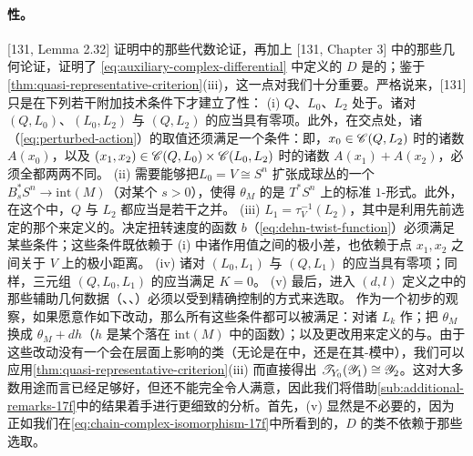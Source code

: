\paragraph{\trAcyclic{}性。}\label{sub:acyclicity}
[131, Lemma 2.32] 证明中的那些代数论证，再加上 [131, Chapter 3] 中的那些几何论证，证明了 \eqref{eq:auxiliary-complex-differential} 中定义的\trComplex{} $D$ 是\trAcyclic{}的；鉴于\cref{thm:quasi-representative-criterion}(iii)，这一点对我们十分重要。严格说来，[131] 只是在下列若干附加技术条件下才建立了\trAcyclic{}性：
(i) $Q$、$L_0$、$L_2$ 处于\trGeneralPosition{}。诸对 $(Q,L_0)$、$(L_0,L_2)$ 与 $(Q,L_2)$ 的\trFloerDatum{}应当具有零\trHamilton{}项。此外，在交点处，诸\trActionFunctional（\eqref{eq:perturbed-action}）的取值还须满足一个条件：即，$x_0\in\mathscr{C}(Q,L_2)$ 时的诸数 $A(x_0)$，以及 $(x_1,x_2)\in\mathscr{C}(Q,L_0)\times\mathscr{C}(L_0,L_2)$ 时的诸数 $A(x_1)+A(x_2)$，必须全都两两不同。
(ii) 需要能够把\trFrame{}$L_0=V\cong S^n$ 扩张成\trCotangent{}球丛的一个\trSymplectic\trEmbedding{}$B_s^*S^n\to\mathrm{int}(M)$（对某个 $s>0$），使得 $\theta_M$ 的\trPullback{}是 $T^*S^n$ 上的标准 $1$-形式。此外，在这个\trTubularNeighborhood{}中，$Q$ 与 $L_2$ 都应当是若干\trCotangentFibre{}之并。
(iii) $L_1=\tau_V^{-1}(L_2)$，其中\trDehnTwist{}是利用先前选定的那个\trTubularNeighborhood{}来定义的。决定扭转速度的函数 $b$（\eqref{eq:dehn-twist-function}）必须满足某些条件；这些条件既依赖于 (i) 中诸作用值之间的极小差，也依赖于点 $x_1,x_2$ 之间关于 $V$ 上\trSphere\trMetric{}的极小距离。
(iv) 诸对 $(L_0,L_1)$ 与 $(Q,L_1)$ 的\trFloerDatum{}应当具有零\trHamilton{}项；同样，三元组 $(Q,L_0,L_1)$ 的\trPerturbationDatum{}应当满足 $K=0$。
(v) 最后，进入 $(d,l)$ 定义之中的那些辅助几何数据（\trLefschetzFibration、\trLagrange\trBoundaryCondition、\trRelative\trPerturbationDatum）必须以受到精确控制的方式来选取。
作为一个初步的观察，如果愿意作如下改动，那么所有这些条件都可以被满足：对诸 $L_k$ 作\trLagrange\trIsotopy；把 $\theta_M$ 换成 $\theta_M+dh$（$h$ 是某个\trSupport{}落在 $\mathrm{int}(M)$ 中的函数）；以及更改用来定义\trFukayaCategory{}的\trFloerDatum{}与\trPerturbationDatum。由于这些改动没有一个会在\trCohomology{}层面上影响\trObject{}的\trIsomorphism{}类（无论是在\trFukayaCategory{}中，还是在其\trAinfty-模\trCategory{}中），我们可以应用\cref{thm:quasi-representative-criterion}(iii) 而直接得出 $\mathscr{T}_{Y_0}(\mathscr{Y}_1)\cong\mathscr{Y}_2$。这对大多数用途而言已经足够好，但还不能完全令人满意，因此我们将借助\cref{sub:additional-remarks-17f}中的结果着手进行更细致的分析。首先，(v) 显然是不必要的，因为正如我们在\eqref{eq:chain-complex-isomorphism-17f}中所看到的，$D$ 的\trIsomorphism{}类不依赖于那些选取。
